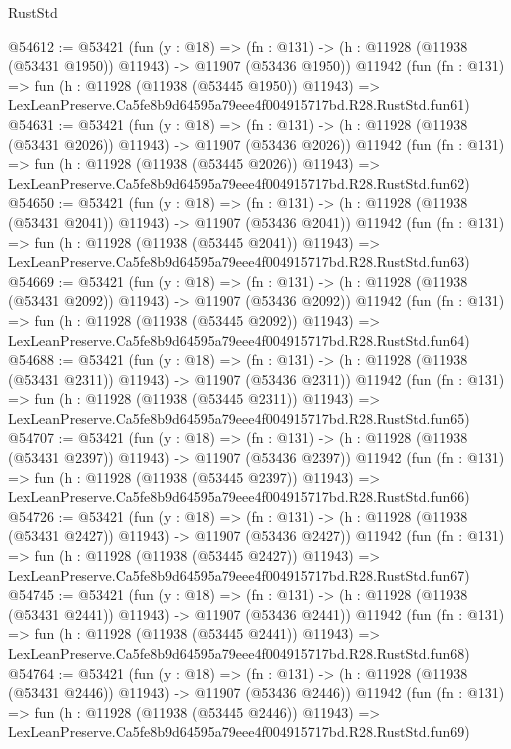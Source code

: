 \begin{lexlean}{RustStd}
\begin{coremodule}
@54612 := @53421
    (fun (y : @18) =>
    (fn : @131) -> (h : @11928 (@11938 (@53431 @1950)) @11943) -> @11907 (@53436 @1950))
    @11942
    (fun (fn : @131) =>
    fun (h : @11928 (@11938 (@53445 @1950)) @11943) =>
    LexLeanPreserve.Ca5fe8b9d64595a79eee4f004915717bd.R28.RustStd.fun61)
@54631 := @53421
    (fun (y : @18) =>
    (fn : @131) -> (h : @11928 (@11938 (@53431 @2026)) @11943) -> @11907 (@53436 @2026))
    @11942
    (fun (fn : @131) =>
    fun (h : @11928 (@11938 (@53445 @2026)) @11943) =>
    LexLeanPreserve.Ca5fe8b9d64595a79eee4f004915717bd.R28.RustStd.fun62)
@54650 := @53421
    (fun (y : @18) =>
    (fn : @131) -> (h : @11928 (@11938 (@53431 @2041)) @11943) -> @11907 (@53436 @2041))
    @11942
    (fun (fn : @131) =>
    fun (h : @11928 (@11938 (@53445 @2041)) @11943) =>
    LexLeanPreserve.Ca5fe8b9d64595a79eee4f004915717bd.R28.RustStd.fun63)
@54669 := @53421
    (fun (y : @18) =>
    (fn : @131) -> (h : @11928 (@11938 (@53431 @2092)) @11943) -> @11907 (@53436 @2092))
    @11942
    (fun (fn : @131) =>
    fun (h : @11928 (@11938 (@53445 @2092)) @11943) =>
    LexLeanPreserve.Ca5fe8b9d64595a79eee4f004915717bd.R28.RustStd.fun64)
@54688 := @53421
    (fun (y : @18) =>
    (fn : @131) -> (h : @11928 (@11938 (@53431 @2311)) @11943) -> @11907 (@53436 @2311))
    @11942
    (fun (fn : @131) =>
    fun (h : @11928 (@11938 (@53445 @2311)) @11943) =>
    LexLeanPreserve.Ca5fe8b9d64595a79eee4f004915717bd.R28.RustStd.fun65)
@54707 := @53421
    (fun (y : @18) =>
    (fn : @131) -> (h : @11928 (@11938 (@53431 @2397)) @11943) -> @11907 (@53436 @2397))
    @11942
    (fun (fn : @131) =>
    fun (h : @11928 (@11938 (@53445 @2397)) @11943) =>
    LexLeanPreserve.Ca5fe8b9d64595a79eee4f004915717bd.R28.RustStd.fun66)
@54726 := @53421
    (fun (y : @18) =>
    (fn : @131) -> (h : @11928 (@11938 (@53431 @2427)) @11943) -> @11907 (@53436 @2427))
    @11942
    (fun (fn : @131) =>
    fun (h : @11928 (@11938 (@53445 @2427)) @11943) =>
    LexLeanPreserve.Ca5fe8b9d64595a79eee4f004915717bd.R28.RustStd.fun67)
@54745 := @53421
    (fun (y : @18) =>
    (fn : @131) -> (h : @11928 (@11938 (@53431 @2441)) @11943) -> @11907 (@53436 @2441))
    @11942
    (fun (fn : @131) =>
    fun (h : @11928 (@11938 (@53445 @2441)) @11943) =>
    LexLeanPreserve.Ca5fe8b9d64595a79eee4f004915717bd.R28.RustStd.fun68)
@54764 := @53421
    (fun (y : @18) =>
    (fn : @131) -> (h : @11928 (@11938 (@53431 @2446)) @11943) -> @11907 (@53436 @2446))
    @11942
    (fun (fn : @131) =>
    fun (h : @11928 (@11938 (@53445 @2446)) @11943) =>
    LexLeanPreserve.Ca5fe8b9d64595a79eee4f004915717bd.R28.RustStd.fun69)

\end{coremodule}
\end{lexlean}
